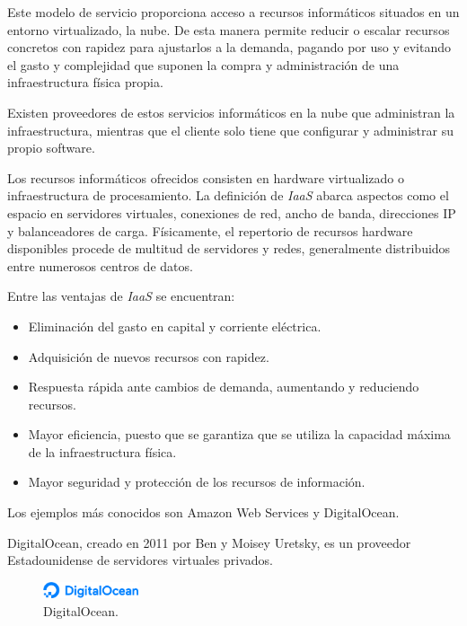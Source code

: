 Este modelo de servicio proporciona acceso a recursos informáticos situados en un entorno virtualizado, la nube. De esta manera permite reducir o escalar recursos  concretos con rapidez para ajustarlos a la demanda, pagando por uso y evitando el gasto y complejidad que suponen la compra y administración de una infraestructura física propia.

Existen proveedores de estos servicios informáticos en la nube que administran la infraestructura, mientras que el cliente solo tiene que configurar y administrar su propio software.

Los recursos informáticos ofrecidos consisten en hardware virtualizado o infraestructura de procesamiento. La definición de \textit{IaaS} abarca aspectos como el espacio en servidores virtuales, conexiones de red, ancho de banda, direcciones IP y balanceadores de carga. Físicamente, el repertorio de recursos hardware disponibles procede de multitud de servidores y redes, generalmente distribuidos entre numerosos centros de datos.

Entre las ventajas de \textit{IaaS} se encuentran:
\begin{itemize}
\item Eliminación del gasto en capital y corriente eléctrica.
\item Adquisición de nuevos recursos con rapidez.
\item Respuesta rápida ante cambios de demanda, aumentando y reduciendo recursos.
\item Mayor eficiencia, puesto que se garantiza que se utiliza la capacidad máxima de la infraestructura física.
\item Mayor seguridad y protección de los recursos de información.
\end{itemize}

Los ejemplos más conocidos son Amazon Web Services\cite{aws wiki} y DigitalOcean\cite{digitaloceanwiki}.

DigitalOcean, creado en 2011 por Ben y Moisey Uretsky, es un proveedor Estadounidense de servidores virtuales privados.

\begin{figure}[H]
\centering
\includegraphics[width=0.25\textwidth]{images/figures/digitalocean.png}
\caption{DigitalOcean.\footnotemark}
\end{figure}


